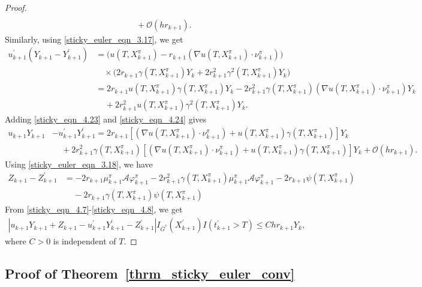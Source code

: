 \documentclass{article}
\theoremstyle{definition}
\numberwithin{equation}{section}
\begin{document}
\begin{proof}
\begin{align}
   \\   & \;\;\;\;
   + \mathcal{O}(hr_{k+1}).  \label{sticky_eqn_4.23}
\end{align}
Similarly, using \eqref{sticky_euler_eqn_3.17}, we get
\begin{align}
    u^{'}_{k+1}(Y_{k+1} - Y_{k+1}^{'}) &= \big(u(T, X^{\pi}_{k+1}) - r_{k+1}(\nabla u(T, X_{k+1}^{\pi}) \cdot \nu^{\pi}_{k+1})\big)
    \nonumber \\ & \quad \times \big( 2 r_{k+1}\gamma(T, X^{\pi}_{k+1})Y_k+ 2 r_{k+1}^2\gamma^2(T, X^{\pi}_{k+1})Y_k\big)
    \nonumber 
    \\   & 
    = 2r_{k+1}u(T, X^{\pi}_{k+1})\gamma(T, X^{\pi}_{k+1})Y_{k} - 2r^2_{k+1}\gamma(T, X^{\pi}_{k+1})(\nabla u(T, X_{k+1}^{\pi}) \cdot \nu^{\pi}_{k+1})Y_{k}
    \nonumber \\ &  \;\;\;\; +  2r_{k+1}^2u(T, X_{k+1}^{\pi}) \gamma^2(T, X^{\pi}_{k+1})Y_k.\label{sticky_eqn_4.24}
\end{align}
Adding \eqref{sticky_eqn_4.23} and \eqref{sticky_eqn_4.24} gives
\begin{align}
    u_{k+1}Y_{k+1} &- u^{'}_{k+1}Y_{k+1}^{'} = 2r_{k+1}[(\nabla u(T, X^{\pi}_{k+1}) \cdot  \nu^{\pi}_{k+1}) + u(T, X^{\pi}_{k+1})\gamma(T, X^{\pi}_{k+1})]Y_{k} 
  \nonumber   \\   & \;\;\; \; 
   + 2r_{k+1}^2\gamma(T, X^{\pi}_{k+1})[(\nabla u(T, X^{\pi}_{k+1}) \cdot \nu^{\pi}_{k+1}) 
    +  u(T, X_{k+1}^{\pi}) \gamma(T, X^{\pi}_{k+1})]Y_k + \mathcal{O}(hr_{k+1}).\label{sticky_eqn_4.7}
\end{align}
Using \eqref{sticky_euler_eqn_3.18}, we have
\begin{align}
    Z_{k+1} - Z_{k+1}^{'} &=  -2r_{k+1}\mu^{\pi}_{k+1}\mathcal{A}\varphi^{\pi}_{k+1} -2r^{2}_{k+1}\gamma(T, X^{\pi}_{k+1})\mu^{\pi}_{k+1}\mathcal{A}\varphi^{\pi}_{k+1} - 2r_{k+1}\psi(T, X^{\pi}_{k+1}) \nonumber \\  &  \;\;\;\; - 2r_{k+1}\gamma(T, X^{\pi}_{k+1})\psi(T, X^{\pi}_{k+1})\label{sticky_eqn_4.8}
\end{align}
From \eqref{sticky_eqn_4.7}-\eqref{sticky_eqn_4.8}, we get
\begin{align*}
    |u_{k+1}Y_{k+1} + Z_{k+1} - u_{k+1}^{'}Y_{k+1}^{'} - Z_{k+1}^{'}   |I_{\bar{G}^{c}}(X_{k+1}^{'})I(t^{'}_{k+1} > T) \leq Chr_{k+1}Y_{k}, 
\end{align*}
where $C>0$ is independent of $T$. 
\end{proof}


\subsection{Proof of Theorem~\ref{thrm_sticky_euler_conv}}\label{sticky_subsec_conv_proof}
\end{document}
